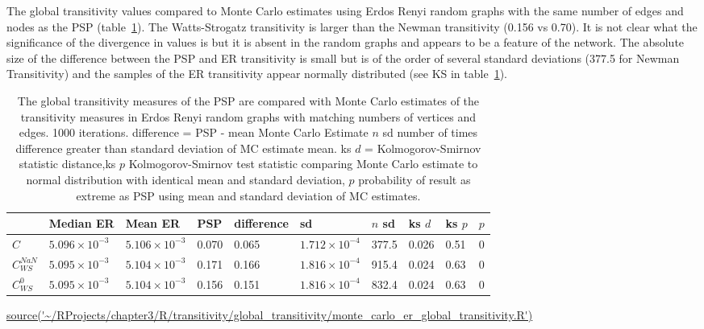 The global transitivity values compared to Monte Carlo estimates using Erdos Renyi random graphs with the same number of edges and nodes as the PSP (table~\ref{tab:MC estimate of ER transitivity}). The Watts-Strogatz transitivity is larger than the Newman transitivity (0.156 vs 0.70). It is not clear what the significance of the divergence in values is \cite{newman2018networks} but it is absent in the random graphs and appears to be a feature of the network. The absolute size of the difference between the PSP and ER transitivity is small but is of the order of several standard deviations (377.5 for Newman Transitivity) and the samples of the ER transitivity appear normally distributed (see KS in table~\ref{tab:MC estimate of ER transitivity}).


\begin{table}[ht]
\centering
\begin{adjustbox}{width=\textwidth}
\begin{tabular}{llllllllll}
  \toprule
 & Median ER & Mean ER & PSP & difference & sd & $n$ sd & ks $d$ & ks $p$ & $p$ \\ 
  \midrule
$C$ & $5.096 \times 10^{-3}$ & $5.106 \times 10^{-3}$ & 0.070 & 0.065 & $1.712 \times 10^{-4}$ & 377.5 & 0.026 & 0.51 & 0 \vspace{1mm} \\ 
  $C_{WS}^{NaN}$ & $5.095 \times 10^{-3}$ & $5.104 \times 10^{-3}$ & 0.171 & 0.166 & $1.816 \times 10^{-4}$ & 915.4 & 0.024 & 0.63 & 0 \vspace{1mm} \\ 
  $C_{WS}^0$ & $5.095 \times 10^{-3}$ & $5.104 \times 10^{-3}$ & 0.156 & 0.151 & $1.816 \times 10^{-4}$ & 832.4 & 0.024 & 0.63 & 0 \vspace{1mm}\\ 
   \bottomrule
\end{tabular}
\end{adjustbox}
\caption[Global transitivity of PSP and Monte Carlo estimates - Erdos-Renyi]{The global transitivity measures of the PSP are compared with Monte Carlo estimates of the transitivity measures in Erdos Renyi random graphs with matching numbers of vertices and edges. 1000 iterations. difference  = PSP - mean Monte Carlo Estimate $n$ sd number of times difference greater than standard deviation of MC estimate mean. ks $d$ = Kolmogorov-Smirnov statistic distance,ks $p$ Kolmogorov-Smirnov test statistic comparing Monte Carlo estimate to normal distribution with identical mean and standard deviation,  $p$ probability of result as extreme as PSP using mean and standard deviation of MC estimates.} \tiny\url{source('~/RProjects/chapter3/R/transitivity/global_transitivity/monte_carlo_er_global_transitivity.R')} 
\label{tab:MC estimate of ER transitivity}
\end{table}


